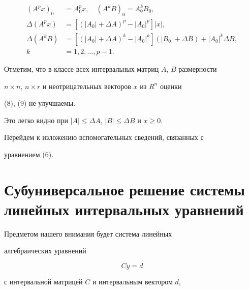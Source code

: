 \begin{equation} 


\begin{split} 


(A^p x)_0&=A^p_0x,\quad (A^k B)_0=A^k_0B_0,\\ 


\Delta(A^p x)&=[(|A_0|+\Delta A)^p-|A_0|^p]|x|,\\ 


\Delta(A^k B)&=[(|A_0|+\Delta A)^k-|A_0|^k] 


(|B_0|+\Delta B)+|A_0|^k\Delta B,\\ 


k&=1,2,\dotsc,p-1. 


\end{split} 


\end{equation} 


 


Отметим, что в классе всех интервальных матриц $A$, $B$ размерности 


$n\times n$, $n\times r$ и неотрицательных векторов $x$ из $R^n$ оценки 


(8), (9) не улучшаемы. 


Это легко видно при $|A|\le\Delta A$, $|B|\le\Delta B$ и $x\ge 0$. 


 


Перейдем к изложению вспомогательных сведений, связанных с 


уравнением (6). 


 


\section{Субуниверсальное решение системы \protect\\ 


линейных интервальных уравнений} 


 


Предметом нашего внимания будет система линейных 


алгебраических уравнений 


\begin{equation} 


Cy=d 


\end{equation} 


с интервальной матрицей $C$ и интервальным вектором $d$,


